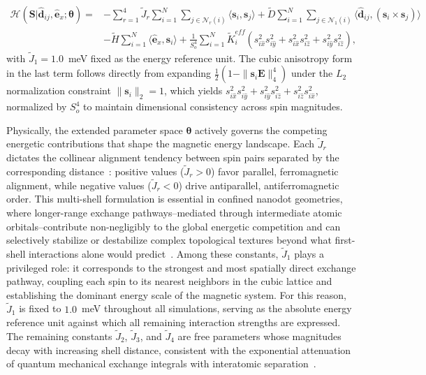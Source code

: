 \documentclass[final,5p,times,twocolumn]{elsarticle}
\begin{document}
\begin{align}\label{eq:Hamiltonian}
\mathcal{H}\left(\mathbf{S}|\hat{\mathbf{d}}_{ij},\hat{\mathbf{e}}_x;
\boldsymbol{\theta}\right) = 
&- \sum_{r=1}^{4}\tilde{J}_r 
    \sum_{i=1}^{N}\sum_{j\in \mathcal{N}_r(i)} 
    \langle \mathbf{s}_i, \mathbf{s}_j \rangle \nonumber + \tilde{D} \sum_{i=1}^{N}\sum_{j\in \mathcal{N}_1(i)} 
    \langle \hat{\mathbf{d}}_{ij},(\mathbf{s}_i \times \mathbf{s}_j)
    \rangle \nonumber \\
&- \tilde{H} \sum_{i=1}^{N} 
    \langle \hat{\mathbf{e}}_x, \mathbf{s}_i \rangle \nonumber + \frac{1}{S_o^4}\sum_{i=1}^{N} \tilde{K}_i^{eff}
    \left(s_{i\hat{x}}^2 s_{i\hat{y}}^2 + 
          s_{i\hat{x}}^2 s_{i\hat{z}}^2 + 
          s_{i\hat{y}}^2 s_{i\hat{z}}^2\right),
\end{align}
with $\tilde{J}_1 = 1.0$~meV fixed as the energy reference unit. The cubic anisotropy form in the last term follows directly from expanding $\frac{1}{2}(1 - \|\mathbf{s}_i\mathbf{E}\|_4^4)$ under the $L_2$ normalization constraint $\|\mathbf{s}_i\|_2 = 1$, which 
yields $s_{i\hat{x}}^2 s_{i\hat{y}}^2 + s_{i\hat{y}}^2 
s_{i\hat{z}}^2 + s_{i\hat{z}}^2 s_{i\hat{x}}^2$, normalized by $S_o^4$ to maintain dimensional consistency across spin magnitudes.

Physically, the extended parameter space $\boldsymbol{\theta}$ actively governs the competing energetic contributions that shape the magnetic energy landscape. Each $\tilde{J}_r$ dictates the collinear alignment tendency between spin pairs separated by the corresponding distance~\cite{coey2010magnetism}: positive values ($\tilde{J}_r > 0$) favor parallel, ferromagnetic 
alignment, while negative values ($\tilde{J}_r < 0$) drive 
antiparallel, antiferromagnetic order. This multi-shell formulation is essential in confined nanodot geometries, where longer-range exchange pathways--mediated through intermediate atomic orbitals--contribute non-negligibly to the global energetic competition and can selectively stabilize or destabilize complex topological textures beyond what first-shell interactions alone would predict~\cite{eriksson2017atomistic}. Among these constants, $\tilde{J}_1$ plays a privileged role: it 
corresponds to the strongest and most spatially direct exchange pathway, coupling each spin to its nearest neighbors in the cubic lattice and establishing the dominant energy scale of the magnetic system. For this reason, $\tilde{J}_1$ is fixed to $1.0$~meV throughout all simulations, serving as the absolute energy reference unit against which all remaining interaction strengths are expressed. The remaining constants $\tilde{J}_2$, $\tilde{J}_3$, and $\tilde{J}_4$ are free parameters whose magnitudes decay with increasing shell distance, consistent with the exponential attenuation of quantum mechanical exchange integrals with interatomic separation~\cite{coey2010magnetism}.
\end{document}
